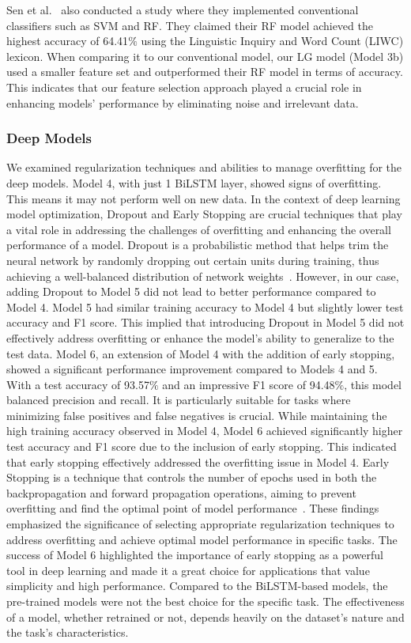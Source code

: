 \documentclass[12pt]{article}
\begin{document}
Sen et al.~\cite{csen2020multimodal} also conducted a study where they implemented conventional classifiers such as SVM and RF. They claimed their RF model achieved the highest accuracy of 64.41$\%$ using the Linguistic Inquiry and Word Count (LIWC) lexicon. When comparing it to our conventional model, our LG model (Model 3b) used a smaller feature set and outperformed their RF model in terms of accuracy. This indicates that our feature selection approach played a crucial role in enhancing models' performance by eliminating noise and irrelevant data.

\subsubsection{Deep Models}

We examined regularization techniques and abilities to manage overfitting for the deep models. Model 4, with just 1 BiLSTM layer, showed signs of overfitting. This means it may not perform well on new data. In the context of deep learning model optimization, Dropout and Early Stopping are crucial techniques that play a vital role in addressing the challenges of overfitting and enhancing the overall performance of a model. Dropout is a probabilistic method that helps trim the neural network by randomly dropping out certain units during training, thus achieving a well-balanced distribution of network weights~\cite{sitaula2017analysis}. However, in our case, adding Dropout to Model 5 did not lead to better performance compared to Model 4. Model 5 had similar training accuracy to Model 4 but slightly lower test accuracy and F1 score. This implied that introducing Dropout in Model 5 did not effectively address overfitting or enhance the model's ability to generalize to the test data. Model 6, an extension of Model 4 with the addition of early stopping, showed a significant performance improvement compared to Models 4 and 5. With a test accuracy of 93.57$\%$ and an impressive F1 score of 94.48$\%$, this model balanced precision and recall. It is particularly suitable for tasks where minimizing false positives and false negatives is crucial. While maintaining the high training accuracy observed in Model 4, Model 6 achieved significantly higher test accuracy and F1 score due to the inclusion of early stopping. This indicated that early stopping effectively addressed the overfitting issue in Model 4. Early Stopping is a technique that controls the number of epochs used in both the backpropagation and forward propagation operations, aiming to prevent overfitting and find the optimal point of model performance~\cite{sitaula2017analysis}. These findings emphasized the significance of selecting appropriate regularization techniques to address overfitting and achieve optimal model performance in specific tasks. The success of Model 6 highlighted the importance of early stopping as a powerful tool in deep learning and made it a great choice for applications that value simplicity and high performance. Compared to the BiLSTM-based models, the pre-trained models were not the best choice for the specific task. The effectiveness of a model, whether retrained or not, depends heavily on the dataset's nature and the task's characteristics. 
\end{document}
